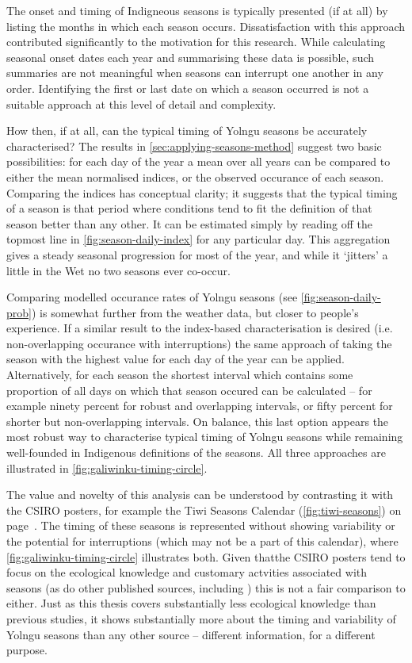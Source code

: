 The onset and timing of Indigneous seasons is typically presented (if at all)
by listing the months in which each season occurs.  Dissatisfaction with this
approach contributed significantly to the motivation for this research.
%
While calculating seasonal onset dates each year and summarising these data
is possible, such summaries are not meaningful when seasons can interrupt
one another in any order.  Identifying the first or last date on which a
season occurred is not a suitable approach at this level of detail and complexity.

How then, if at all, can the typical timing of Yolngu seasons be accurately
characterised?  The results in \cref{sec:applying-seasons-method} suggest two
basic possibilities: for each day of the year a mean over all years can be
compared to either the mean normalised indices, or the observed occurance
of each season.
%
Comparing the indices has conceptual clarity; it suggests that the
typical timing of a season is that period where conditions tend to fit the
definition of that season better than any other.  It can be estimated simply
by reading off the topmost line in \cref{fig:season-daily-index} for any
particular day.  This aggregation gives a steady seasonal progression for most of the
year, and while it `jitters' a little in the Wet no two seasons ever co-occur.

Comparing modelled occurance rates of Yolngu seasons (see \cref{fig:season-daily-prob}) is somewhat
further from the weather data, but closer to people's experience.  If a similar
result to the index-based characterisation is desired (i.e. non-overlapping occurance
with interruptions) the same approach of taking the season
with the highest value for each day of the year can be applied.
%
Alternatively, for each season the shortest interval which contains some
proportion of all days on which that season occured can be calculated --
for example ninety percent for robust and overlapping intervals, or fifty percent for
shorter but non-overlapping intervals.  On balance, this last option
appears the most robust way to characterise typical timing of Yolngu seasons while
remaining well-founded in Indigenous definitions of the seasons.
%
All three approaches are illustrated in \cref{fig:galiwinku-timing-circle}.


The value and novelty of this analysis can be understood by contrasting it with the CSIRO
posters, for example the Tiwi Seasons Calendar (\cref{fig:tiwi-seasons}) on
page~\pageref{fig:tiwi-seasons}.  The timing of these seasons is represented
without showing variability or the potential for interruptions (which may not
be a part of this calendar), where \cref{fig:galiwinku-timing-circle}
illustrates both.
%
Given thatthe CSIRO posters tend to focus on the ecological knowledge and
customary actvities associated with seasons (as do other published sources,
including \citet[eg.][]{davis1989,barber2005,BOM-iwk}) this is not a fair
comparison to either.  Just as this thesis covers substantially less
ecological knowledge than previous studies, it shows substantially more
about the timing and variability of Yolngu seasons than any other source --
different information, for a different purpose.


